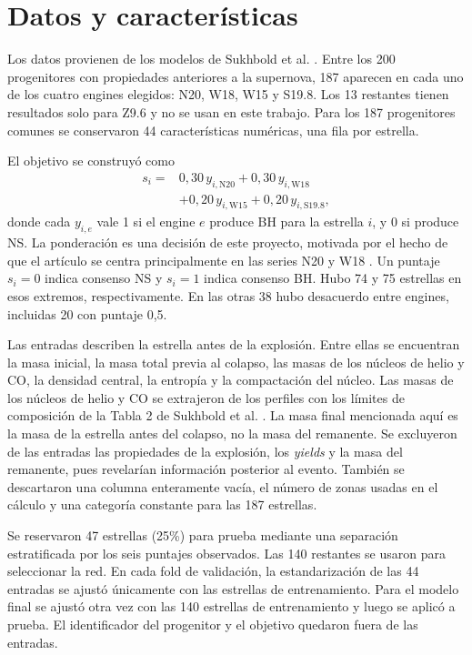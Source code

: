 \documentclass[conference,a4paper]{IEEEtran}
\begin{document}
\section{Datos y características}
Los datos provienen de los modelos de Sukhbold et al. \cite{sukhbold}. Entre los 200 progenitores con propiedades anteriores a la supernova, 187 aparecen en cada uno de los cuatro engines elegidos: N20, W18, W15 y S19.8. Los 13 restantes tienen resultados solo para Z9.6 y no se usan en este trabajo. Para los 187 progenitores comunes se conservaron 44 características numéricas, una fila por estrella.

El objetivo se construyó como
\begin{equation}
\begin{aligned}
s_i ={}& 0{,}30\,y_{i,\mathrm{N20}} + 0{,}30\,y_{i,\mathrm{W18}} \\
&+ 0{,}20\,y_{i,\mathrm{W15}} + 0{,}20\,y_{i,\mathrm{S19.8}},
\end{aligned}
\label{eq:target}
\end{equation}
donde cada $y_{i,e}$ vale 1 si el engine $e$ produce BH para la estrella $i$, y 0 si produce NS. La ponderación es una decisión de este proyecto, motivada por el hecho de que el artículo se centra principalmente en las series N20 y W18 \cite{sukhbold}. Un puntaje $s_i=0$ indica consenso NS y $s_i=1$ indica consenso BH. Hubo 74 y 75 estrellas en esos extremos, respectivamente. En las otras 38 hubo desacuerdo entre engines, incluidas 20 con puntaje 0,5.

Las entradas describen la estrella antes de la explosión. Entre ellas se encuentran la masa inicial, la masa total previa al colapso, las masas de los núcleos de helio y CO, la densidad central, la entropía y la compactación del núcleo. Las masas de los núcleos de helio y CO se extrajeron de los perfiles con los límites de composición de la Tabla 2 de Sukhbold et al. \cite{sukhbold}. La masa final mencionada aquí es la masa de la estrella antes del colapso, no la masa del remanente. Se excluyeron de las entradas las propiedades de la explosión, los \emph{yields} y la masa del remanente, pues revelarían información posterior al evento. También se descartaron una columna enteramente vacía, el número de zonas usadas en el cálculo y una categoría constante para las 187 estrellas.

Se reservaron 47 estrellas (25\%) para prueba mediante una separación estratificada por los seis puntajes observados. Las 140 restantes se usaron para seleccionar la red. En cada fold de validación, la estandarización de las 44 entradas se ajustó únicamente con las estrellas de entrenamiento. Para el modelo final se ajustó otra vez con las 140 estrellas de entrenamiento y luego se aplicó a prueba. El identificador del progenitor y el objetivo quedaron fuera de las entradas.
\end{document}
